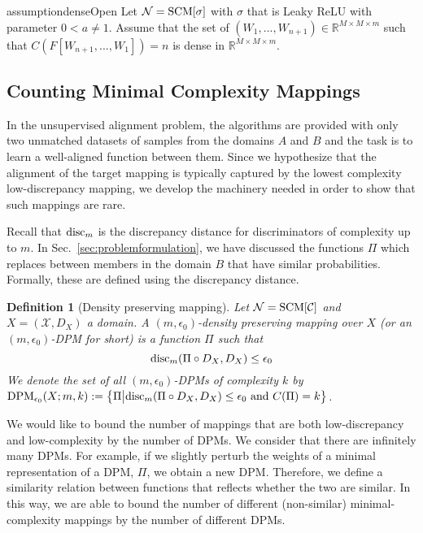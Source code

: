 \documentclass{article} %
\newtheorem{defn}{Definition}
\newcommand{\disc}{\textnormal{disc}}
\begin{document}
 

\begin{restatable}{assumption}{denseOpen}\label{assumption:denseOpen} Let $\mathcal{N} = \textnormal{SCM}[\sigma]$ with $\sigma$ that is Leaky ReLU with parameter $0<a\neq 1$. Assume that the set of $(W_1,...,W_{n+1})\in \mathbb{R}^{M\times M \times m}$ such that $C(F[W_{n+1},...,W_1])=n$ is dense in $\mathbb{R}^{M\times M \times m}$. 
\end{restatable}

 

 

 

\subsection{Counting Minimal Complexity Mappings}

\label{sec:justalignment}

 In the unsupervised alignment problem, the algorithms are provided with only two unmatched datasets of samples from the domains $A$ and $B$ and the task is to learn a well-aligned function between them. Since we hypothesize that the alignment of the target mapping is typically captured by the lowest complexity low-discrepancy mapping, we develop the machinery needed in order to show that such mappings are rare.

Recall that $\disc_m$ is the discrepancy distance for discriminators of complexity up to $m$. In Sec.~\ref{sec:problemformulation}, we have discussed the functions $\Pi$ which replaces between members in the domain $B$ that have similar probabilities. Formally, these are defined using the discrepancy distance.

 

\begin{defn}[Density preserving mapping]\label{def:DPM} Let $\mathcal{N} = \textnormal{SCM}[\mathcal{C}]$ and $X = (\mathcal{X},D_X)$ a domain. A $(m,\epsilon_0)$-density preserving mapping over $X$ (or an $(m,\epsilon_0)$-DPM for short) is a function $\Pi$ such that 
\begin{equation}
\disc_m(\Pi \circ D_X,D_X) \leq \epsilon_0
\end{equation}
We denote the set of all $(m,\epsilon_0)$-DPMs of complexity $k$ by $\textnormal{DPM}_{\epsilon_0}(X;m,k):=\left\{\Pi \big\vert \disc_m(\Pi \circ D_X,D_X) \leq \epsilon_0
\textnormal{ and } C(\Pi)=k \right\}$.
\end{defn}

We would like to bound the number of mappings that are both low-discrepancy and low-complexity by the number of DPMs. We consider that there are infinitely many DPMs. For example, if we slightly perturb the weights of a minimal representation of a DPM, $\Pi$, we obtain a new DPM. Therefore, we define a similarity relation between functions that reflects whether the two are similar. In this way, we are able to bound the number of different (non-similar) minimal-complexity mappings by the number of different DPMs. 
 
\end{document}
